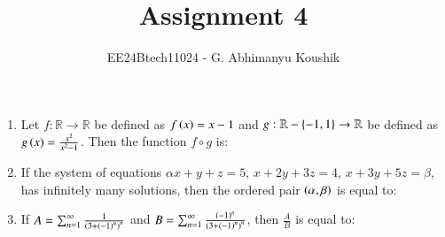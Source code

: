 \documentclass[journal,12pt,onecolumn]{IEEEtran}
\theoremstyle{remark}
\begin{document}
\title{Assignment 4}
\author{EE24Btech11024 - G. Abhimanyu Koushik}
\maketitle
\renewcommand{\thefigure}{\theenumi}
\renewcommand{\thetable}{\theenumi}
\begin{enumerate}

\item Let $f:\mathbb{R}\rightarrow\mathbb{R}$ be defined as $f\left(x\right)=x-1$ and $g:\mathbb{R}-\left\{-1,1\right\}\rightarrow\mathbb{R}$ be defined as $g\left(x\right)=\frac{x^2}{x^2-1}$. Then the function $f\circ g$ is:

\hfill{}
\begin{enumerate}
\end{enumerate}


\item If the system of equations $\alpha x+y+z=5$, $x+2y+3z=4$, $x+3y+5z=\beta$, has infinitely many solutions, then the ordered pair $\left(\alpha,\beta\right)$ is equal to:

\hfill{}
\begin{enumerate}
\end{enumerate}

\item If $A = \sum_{n=1}^{\infty}\frac{1}{\left(3+\left(-1\right)^n\right)^n}$ and $B = \sum_{n=1}^{\infty}\frac{\left(-1\right)^n}{\left(3+\left(-1\right)^n\right)^n}$, then $\frac{A}{B}$ is equal to:

\hfill{}
\begin{enumerate}
\end{enumerate}


\end{enumerate}
\end{document}
